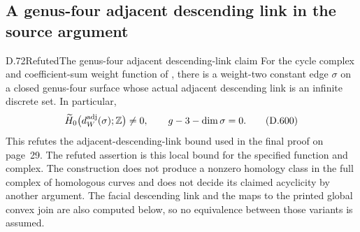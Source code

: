 \subsection{A genus-four adjacent descending link in the source argument}

\begin{result}{D.72}{Refuted}{The genus-four adjacent descending-link claim}
For the cycle complex and coefficient-sum weight function of
\cite{D_Minahan2025}, there is a
weight-two constant edge $\sigma$ on a closed genus-four surface
whose actual adjacent descending link is an infinite discrete set.
In particular,
\[
 \widetilde H_0\bigl(d_W^{\rm adj}(\sigma);\mathbb Z\bigr)\ne0,
 \qquad g-3-\dim\sigma=0.
 \tag{D.600}
\]
This refutes the adjacent-descending-link bound used in the
final proof on page~29.  The refuted assertion is this local
bound for the specified function and complex.
The construction does not produce a nonzero homology class in
the full complex of homologous curves and does not decide
its claimed acyclicity by another argument.
The facial descending link and the maps to the printed
global convex join are also computed below, so no
equivalence between those variants is assumed.
\end{result}

